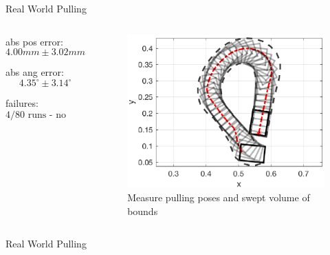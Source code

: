 \documentclass[10pt]{beamer}
\begin{document}
\begin{frame}{Real World Pulling}
  \begin{columns}[c,onlytextwidth]

    \begin{list}{}{
        \setlength{\leftmargin}{0pt}
        \setlength{\labelwidth}{0pt}
        \setlength{\labelsep}{0pt}
      }
    \item abs pos error: 
      \[4.00mm \pm 3.02mm\]
    \item abs ang error: 
      \[4.35^\circ  \pm 3.14^\circ\]
    \item failures:
      \[\text{4/80 runs - no valid plans}\]
    \end{list}


    \begin{figure}
      \begin{center}
        \includegraphics[width=\columnwidth]{fig/trajectory_2.eps}
      \end{center}
      \caption{Measure pulling poses and swept volume of bounds}
    \end{figure}

  \end{columns}
\end{frame}

\begin{frame}{Real World Pulling}
  \centering
\end{frame}
\end{document}
